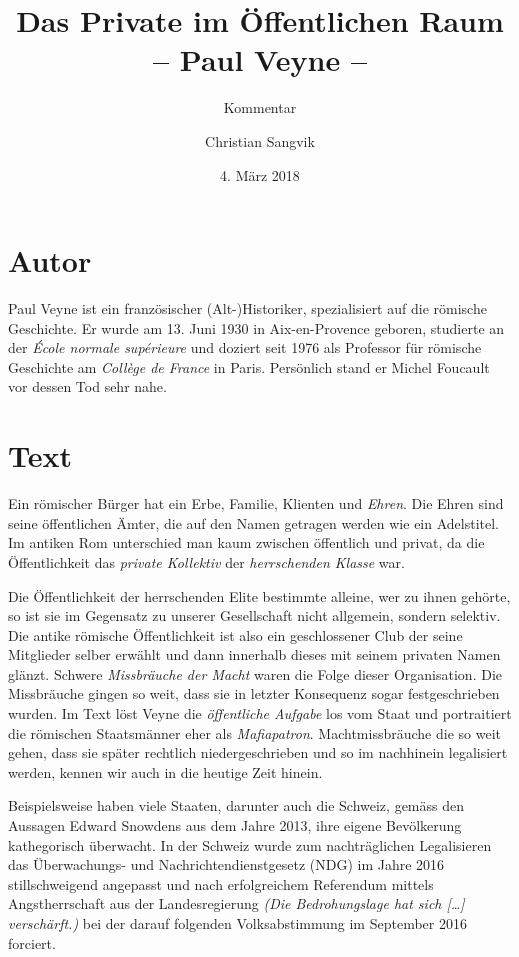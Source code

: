 \documentclass[a4paper,ngerman,11pt]{scrartcl}
\subtitle{Kommentar}
\author{Christian Sangvik}
\date{4. März 2018}
\title{Das Private im Öffentlichen Raum\\-- Paul Veyne --}
\begin{document}
\maketitle

\section{Autor}
\label{sec-1}

Paul Veyne ist ein französischer (Alt-)Historiker, spezialisiert auf die
römische Geschichte. Er wurde am 13. Juni 1930 in Aix-en-Provence geboren,
studierte an der \emph{École normale supérieure} und doziert seit 1976 als
Professor für römische Geschichte am \emph{Collège de France} in Paris. Persönlich
stand er Michel Foucault vor dessen Tod sehr nahe.\cite{wiki:PaulVeyne-de}

\section{Text}
\label{sec-2}

Ein römischer Bürger hat ein Erbe, Familie, Klienten und \emph{Ehren}. Die Ehren
sind seine öffentlichen Ämter, die auf den Namen getragen werden wie ein
Adelstitel.  Im antiken Rom unterschied man kaum zwischen öffentlich und
privat, da die Öffentlichkeit das \emph{private Kollektiv} der \emph{herrschenden
Klasse} war.\cite{Veyne1989}

Die Öffentlichkeit der herrschenden Elite bestimmte alleine, wer zu ihnen
gehörte, so ist sie im Gegensatz zu unserer Gesellschaft nicht allgemein,
sondern selektiv. Die antike römische Öffentlichkeit ist also ein
geschlossener Club der seine Mitglieder selber erwählt und dann innerhalb
dieses mit seinem privaten Namen glänzt. Schwere \emph{Missbräuche der Macht} waren
die Folge dieser Organisation. Die Missbräuche gingen so weit, dass sie in
letzter Konsequenz sogar festgeschrieben wurden.\cite{Veyne1989} Im Text löst
Veyne die \emph{öffentliche Aufgabe} los vom Staat und portraitiert die römischen
Staatsmänner eher als \emph{Mafiapatron}. Machtmissbräuche die so weit gehen, dass
sie später rechtlich niedergeschrieben und so im nachhinein legalisiert
werden, kennen wir auch in die heutige Zeit hinein.

Beispielsweise haben viele Staaten, darunter auch die Schweiz, gemäss den
Aussagen Edward Snowdens aus dem Jahre 2013, ihre eigene Bevölkerung
kathegorisch überwacht.\cite{snowden} In der Schweiz wurde zum nachträglichen
Legalisieren das Überwachungs- und Nachrichtendienstgesetz (NDG) im Jahre 2016
stillschweigend angepasst und nach erfolgreichem Referendum mittels
Angstherrschaft aus der Landesregierung \emph{(Die Bedrohungslage hat sich [\ldots{}]
verschärft.)} \cite{bundesrat} bei der darauf folgenden Volksabstimmung im
September 2016 forciert.
\end{document}
